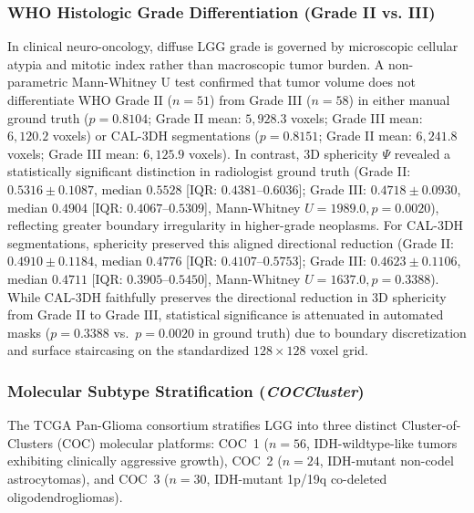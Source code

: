 \documentclass[preprint,12pt,authoryear]{elsarticle}
\begin{document}
\subsubsection{WHO Histologic Grade Differentiation (Grade II vs. III)}
In clinical neuro-oncology, diffuse LGG grade is governed by microscopic cellular atypia and mitotic index rather than macroscopic tumor burden. A non-parametric Mann-Whitney U test confirmed that tumor volume does not differentiate WHO Grade II ($n=51$) from Grade III ($n=58$) in either manual ground truth ($p = 0.8104$; Grade II mean: $5{,}928.3$ voxels; Grade III mean: $6{,}120.2$ voxels) or CAL-3DH segmentations ($p = 0.8151$; Grade II mean: $6{,}241.8$ voxels; Grade III mean: $6{,}125.9$ voxels). In contrast, 3D sphericity $\Psi$ revealed a statistically significant distinction in radiologist ground truth (Grade II: $0.5316 \pm 0.1087$, median $0.5528$ [IQR: $0.4381$--$0.6036$]; Grade III: $0.4718 \pm 0.0930$, median $0.4904$ [IQR: $0.4067$--$0.5309$], Mann-Whitney $U = 1989.0, p = 0.0020$), reflecting greater boundary irregularity in higher-grade neoplasms. For CAL-3DH segmentations, sphericity preserved this aligned directional reduction (Grade II: $0.4910 \pm 0.1184$, median $0.4776$ [IQR: $0.4107$--$0.5753$]; Grade III: $0.4623 \pm 0.1106$, median $0.4711$ [IQR: $0.3905$--$0.5450$], Mann-Whitney $U = 1637.0, p = 0.3388$). While CAL-3DH faithfully preserves the directional reduction in 3D sphericity from Grade II to Grade III, statistical significance is attenuated in automated masks ($p = 0.3388$ vs.\ $p = 0.0020$ in ground truth) due to boundary discretization and surface staircasing on the standardized $128 \times 128$ voxel grid.

\subsubsection{Molecular Subtype Stratification (\textit{COCCluster})}
The TCGA Pan-Glioma consortium stratifies LGG into three distinct Cluster-of-Clusters (COC) molecular platforms: COC~1 ($n=56$, IDH-wildtype-like tumors exhibiting clinically aggressive growth), COC~2 ($n=24$, IDH-mutant non-codel astrocytomas), and COC~3 ($n=30$, IDH-mutant 1p/19q co-deleted oligodendrogliomas).
\end{document}
